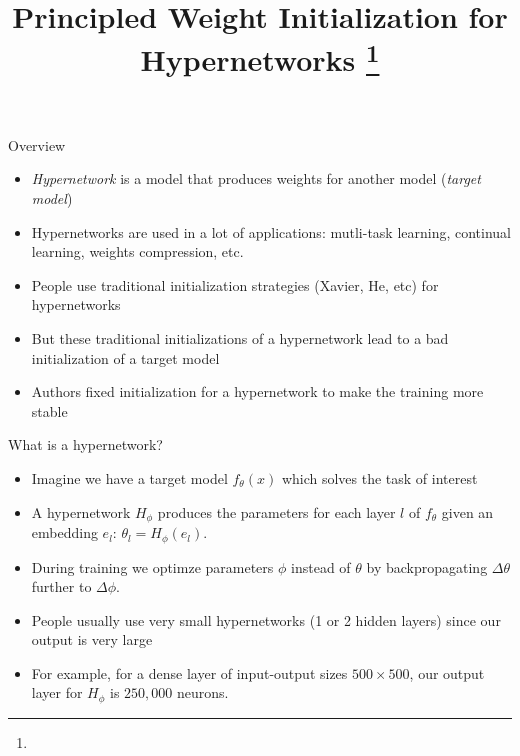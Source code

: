 \documentclass[handout, 10pt]{beamer}
\title{Principled Weight Initialization for Hypernetworks \footnote{\citepaper{HyperNetsWeightInit}}}
\begin{document}
\begin{frame}
    \titlepage
\end{frame}

\begin{frame}{Overview}
\begin{itemize}
    \item\pause \textit{Hypernetwork} is a model that produces weights for another model (\textit{target model})
    \item\pause Hypernetworks are used in a lot of applications: mutli-task learning, continual learning, weights compression, etc. 
    \item\pause People use traditional initialization strategies (Xavier, He, etc) for hypernetworks
    \item\pause But these traditional initializations of a hypernetwork lead to a bad initialization of a target model
    \item\pause Authors fixed initialization for a hypernetwork to make the training more stable
\end{itemize}
\end{frame}

\begin{frame}{What is a hypernetwork?}
\begin{itemize}
    \item\pause Imagine we have a target model $f_\theta(x)$ which solves the task of interest
    \item\pause A hypernetwork $H_\phi$ produces the parameters for each layer $l$ of $f_\theta$ given an embedding $e_l$: $\theta_l = H_\phi(e_l)$.
    \item\pause During training we optimze parameters $\phi$ instead of $\theta$ by backpropagating $\Delta \theta$ further to $\Delta\phi$.
    \item\pause People usually use very small hypernetworks (1 or 2 hidden layers) since our output is very large
    \item\pause For example, for a dense layer of input-output sizes $500 \times 500$, our output layer for $H_\phi$ is $250,000$ neurons.
\end{itemize}
\end{frame}
\end{document}
